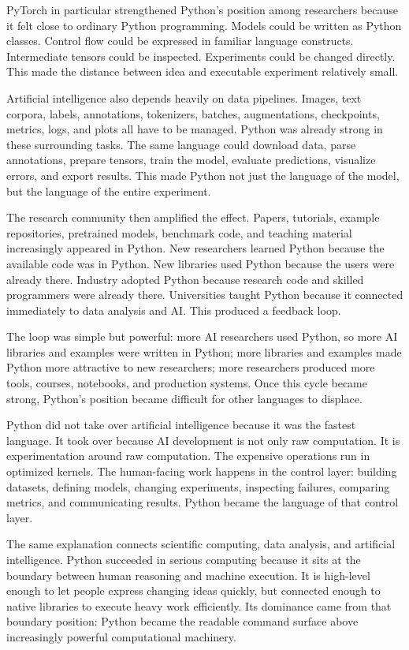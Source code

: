 PyTorch in particular strengthened Python's position among researchers because it felt close to ordinary Python programming. Models could be written as Python classes. Control flow could be expressed in familiar language constructs. Intermediate tensors could be inspected. Experiments could be changed directly. This made the distance between idea and executable experiment relatively small.

Artificial intelligence also depends heavily on data pipelines. Images, text corpora, labels, annotations, tokenizers, batches, augmentations, checkpoints, metrics, logs, and plots all have to be managed. Python was already strong in these surrounding tasks. The same language could download data, parse annotations, prepare tensors, train the model, evaluate predictions, visualize errors, and export results. This made Python not just the language of the model, but the language of the entire experiment.

The research community then amplified the effect. Papers, tutorials, example repositories, pretrained models, benchmark code, and teaching material increasingly appeared in Python. New researchers learned Python because the available code was in Python. New libraries used Python because the users were already there. Industry adopted Python because research code and skilled programmers were already there. Universities taught Python because it connected immediately to data analysis and AI. This produced a feedback loop.

The loop was simple but powerful: more AI researchers used Python, so more AI libraries and examples were written in Python; more libraries and examples made Python more attractive to new researchers; more researchers produced more tools, courses, notebooks, and production systems. Once this cycle became strong, Python's position became difficult for other languages to displace.

Python did not take over artificial intelligence because it was the fastest language. It took over because AI development is not only raw computation. It is experimentation around raw computation. The expensive operations run in optimized kernels. The human-facing work happens in the control layer: building datasets, defining models, changing experiments, inspecting failures, comparing metrics, and communicating results. Python became the language of that control layer.

The same explanation connects scientific computing, data analysis, and artificial intelligence. Python succeeded in serious computing because it sits at the boundary between human reasoning and machine execution. It is high-level enough to let people express changing ideas quickly, but connected enough to native libraries to execute heavy work efficiently. Its dominance came from that boundary position: Python became the readable command surface above increasingly powerful computational machinery.